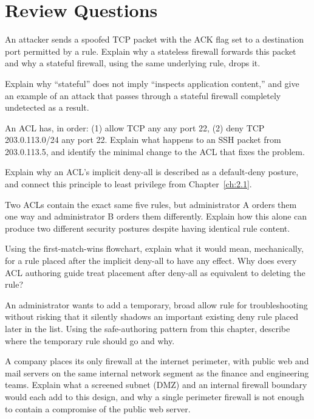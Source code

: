 \section*{Review Questions}
\begin{reviewquestions}
\item An attacker sends a spoofed TCP packet with the ACK flag set to a destination port permitted
by a rule. Explain why a stateless firewall forwards this packet and why a stateful firewall,
using the same underlying rule, drops it.
\item Explain why ``stateful'' does not imply ``inspects application content,'' and give an example
of an attack that passes through a stateful firewall completely undetected as a result.
\item An ACL has, in order: (1) allow TCP any any port 22, (2) deny TCP 203.0.113.0/24 any port 22.
Explain what happens to an SSH packet from 203.0.113.5, and identify the minimal change to the ACL
that fixes the problem.
\item Explain why an ACL's implicit deny-all is described as a default-deny posture, and connect
this principle to least privilege from Chapter~\ref{ch:2.1}.
\item Two ACLs contain the exact same five rules, but administrator A orders them one way and
administrator B orders them differently. Explain how this alone can produce two different security
postures despite having identical rule content.
\item Using the first-match-wins flowchart, explain what it would mean, mechanically, for a rule
placed after the implicit deny-all to have any effect. Why does every ACL authoring guide treat
placement after deny-all as equivalent to deleting the rule?
\item An administrator wants to add a temporary, broad allow rule for troubleshooting without
risking that it silently shadows an important existing deny rule placed later in the list. Using
the safe-authoring pattern from this chapter, describe where the temporary rule should go and why.
\item A company places its only firewall at the internet perimeter, with public web and mail
servers on the same internal network segment as the finance and engineering teams. Explain what a
screened subnet (DMZ) and an internal firewall boundary would each add to this design, and why a
single perimeter firewall is not enough to contain a compromise of the public web server.
\end{reviewquestions}

